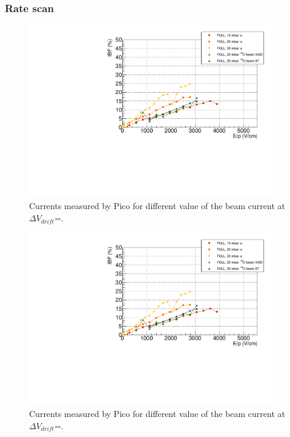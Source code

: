 \documentclass[a4paper, 11 pt]{report}
\newcommand{\Vdrift}{$ \Delta V_{drift}$}
\begin{document}
  \subsubsection{Rate scan}



  \begin{figure}[htbp]
	\centering
	\includegraphics[width=0.95\textwidth]{Immagini/IBF_FULL_Comparison_F.pdf}
	\caption{Currents measured by Pico for different value of the beam current at
	\Vdrift=.}
	\label{fig:Rate_FULL_beam_H}
  \end{figure}
  \begin{figure}[htbp]
	\centering
	\includegraphics[width=0.95\textwidth]{Immagini/IBF_FULL_Comparison_F.pdf}
	\caption{Currents measured by Pico for different value of the beam current at
	\Vdrift=.}
	\label{fig:Rate_FULL_beam_L}
  \end{figure}
\end{document}
